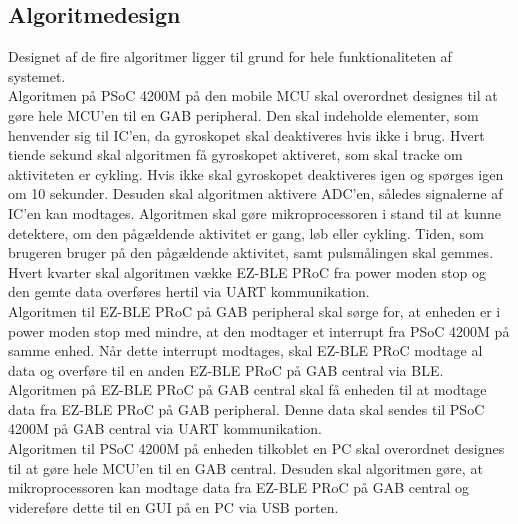 \subsection{Algoritmedesign}
Designet af de fire algoritmer ligger til grund for hele funktionaliteten af systemet. \\
Algoritmen på PSoC 4200M på den mobile MCU skal overordnet designes til at gøre hele MCU'en til en GAB peripheral. Den skal indeholde elementer, som henvender sig til IC'en, da gyroskopet skal deaktiveres hvis ikke i brug. Hvert tiende sekund skal algoritmen få gyroskopet aktiveret, som skal tracke om aktiviteten er cykling. Hvis ikke skal gyroskopet deaktiveres igen og spørges igen om 10 sekunder. Desuden skal algoritmen aktivere ADC'en, således signalerne af IC'en kan modtages. Algoritmen skal gøre mikroprocessoren i stand til at kunne detektere, om den pågældende aktivitet er gang, løb eller cykling. Tiden, som brugeren bruger på den pågældende aktivitet, samt pulsmålingen skal gemmes. Hvert kvarter skal algoritmen vække EZ-BLE PRoC fra power moden stop og den gemte data overføres hertil via UART kommunikation.\\
Algoritmen til EZ-BLE PRoC på GAB peripheral skal sørge for, at enheden er i power moden stop med mindre, at den modtager et interrupt fra PSoC 4200M på samme enhed. Når dette interrupt modtages, skal EZ-BLE PRoC modtage al data og overføre til en anden EZ-BLE PRoC på GAB central via BLE. \\
Algoritmen på EZ-BLE PRoC på GAB central skal få enheden til at modtage data fra EZ-BLE PRoC på GAB peripheral. Denne data skal sendes til PSoC 4200M på GAB central via UART kommunikation. \\
Algoritmen til PSoC 4200M på enheden tilkoblet en PC skal overordnet designes til at gøre hele MCU'en til en GAB central. Desuden skal algoritmen gøre, at mikroprocessoren kan modtage data fra EZ-BLE PRoC på GAB central og videreføre dette til en GUI på en PC via USB porten.

